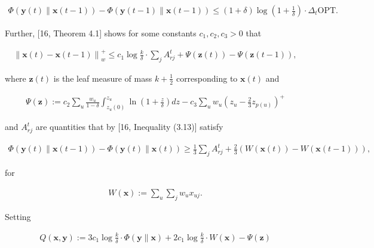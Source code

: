 \documentclass[10pt,a4paper]{article}
\begin{document}
\[\begin{gathered}
\displaystyle\Phi({\boldsymbol{y}}(t)\parallel{\boldsymbol{x}}(t-1))-\Phi({\boldsymbol{y}}(t-1)\parallel{\boldsymbol{x}}(t-1))\leq(1+\delta)\log\left(1+\frac{1}{\delta}\right)\cdot\Delta_{t}{\text{OPT}}.
\end{gathered}\]




Further, [16, Theorem 4.1] shows for some constants $c_{1},c_{2},c_{3}>0$ that\par


\[\begin{gathered}
\displaystyle\left\|{\boldsymbol{x}}(t)-{\boldsymbol{x}}(t-1)\right\|_{w}^{+}\leq c_{1}\log\frac{k}{\delta}\cdot\sum_{j}A_{rj}^{t}+\Psi({\mathbf{z}}(t))-\Psi({\mathbf{z}}(t-1)),
\end{gathered}\]


where ${\mathbf{z}}(t)$ is the leaf measure of mass $k+\frac{1}{2}$ corresponding to ${\boldsymbol{x}}(t)$ and\par


\[\begin{gathered}
\displaystyle\Psi({\mathbf{z}}):=c_{2}\sum_{u}\frac{w_{u}}{1-\delta}\int_{z_{u}(0)}^{z_{u}}\ln\left(1+\frac{z}{\delta}\right)dz-c_{3}\sum_{u}w_{u}\left(z_{u}-\frac{2}{3}z_{p(u)}\right)^{+}
\end{gathered}\]


and $A_{rj}^{t}$ are quantities that by [16, Inequality (3.13)] satisfy\par


\[\begin{gathered}
\displaystyle\Phi({\boldsymbol{y}}(t)\parallel{\boldsymbol{x}}(t-1))-\Phi({\boldsymbol{y}}(t)\parallel{\boldsymbol{x}}(t))\geq\frac{1}{3}\sum_{j}A_{rj}^{t}+\frac{2}{3}(W({\boldsymbol{x}}(t))-W({\boldsymbol{x}}(t-1))),
\end{gathered}\]


for\par


\[\begin{gathered}
\displaystyle W({\boldsymbol{x}}) \displaystyle:=\sum_{u}\sum_{j}w_{u}x_{uj}.
\end{gathered}\]


Setting\par


\[\begin{gathered}
\displaystyle Q({\boldsymbol{x}},{\boldsymbol{y}}):=3c_{1}\log\frac{k}{\delta}\cdot\Phi({\boldsymbol{y}}\parallel{\boldsymbol{x}})+2c_{1}\log\frac{k}{\delta}\cdot W({\boldsymbol{x}})-\Psi({\mathbf{z}})
\end{gathered}\]
\end{document}
